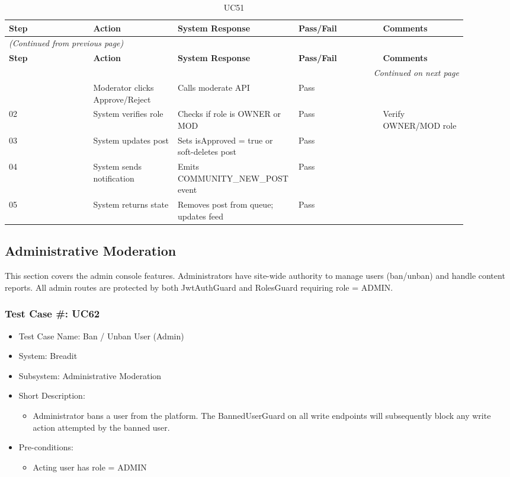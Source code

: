 \begin{longtable}{|p{0.18\linewidth}|p{0.18\linewidth}|p{0.18\linewidth}|p{0.18\linewidth}|p{0.18\linewidth}|}
\caption{UC51} \label{tab:42} \\
\hline
\textbf{Step} & \textbf{Action} & \textbf{System Response} & \textbf{Pass/Fail} & \textbf{Comments} \\
\hline
\endfirsthead
\multicolumn{5}{l}{\textit{(Continued from previous page)}} \\
\hline
\textbf{Step} & \textbf{Action} & \textbf{System Response} & \textbf{Pass/Fail} & \textbf{Comments} \\
\hline
\endhead
\hline \multicolumn{5}{r}{\textit{Continued on next page}} \\
\endfoot
\hline
\endlastfoot
01 & Moderator clicks Approve/Reject & Calls moderate API & Pass &  \\
\hline
02 & System verifies role & Checks if role is OWNER or MOD & Pass & Verify OWNER/MOD role \\
\hline
03 & System updates post & Sets isApproved = true or soft-deletes post & Pass &  \\
\hline
04 & System sends notification & Emits COMMUNITY\_NEW\_POST event & Pass &  \\
\hline
05 & System returns state & Removes post from queue; updates feed & Pass &  \\
\hline
\end{longtable}


\subsection{Administrative Moderation}

This section covers the admin console features. Administrators have site-wide authority to manage users (ban/unban) and handle content reports. All admin routes are protected by both JwtAuthGuard and RolesGuard requiring role = ADMIN.

\subsubsection{Test Case \#: UC62}
\begin{itemize}
  \item Test Case Name: Ban / Unban User (Admin)
  \item System: Breadit
  \item Subsystem: Administrative Moderation
  \item Short Description:
\begin{itemize}
  \item Administrator bans a user from the platform. The BannedUserGuard on all write endpoints will subsequently block any write action attempted by the banned user.
\end{itemize}
  \item Pre-conditions:
\begin{itemize}
  \item Acting user has role = ADMIN
\end{itemize}
\end{itemize}


